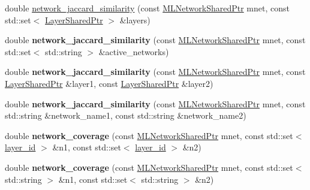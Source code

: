 \begin{DoxyCompactItemize}
\item 
double \hyperlink{namespacemlnet_ac67126e07743387172dfdc8bca49534d}{network\+\_\+jaccard\+\_\+similarity} (const \hyperlink{namespacemlnet_aa6d3fa87865bcde4d1283abb1942cbbb}{M\+L\+Network\+Shared\+Ptr} mnet, const std\+::set$<$ \hyperlink{namespacemlnet_a10c007fb811c55339dd5b9d32bb0505d}{Layer\+Shared\+Ptr} $>$ \&layers)
\item 
\hypertarget{namespacemlnet_ab1cc07d57abc29880ce1508d71ebf62e}{double {\bfseries network\+\_\+jaccard\+\_\+similarity} (const \hyperlink{namespacemlnet_aa6d3fa87865bcde4d1283abb1942cbbb}{M\+L\+Network\+Shared\+Ptr} mnet, const std\+::set$<$ std\+::string $>$ \&active\+\_\+networks)}\label{namespacemlnet_ab1cc07d57abc29880ce1508d71ebf62e}

\item 
\hypertarget{namespacemlnet_a01b6385edb10112a53804d04ec95cedf}{double {\bfseries network\+\_\+jaccard\+\_\+similarity} (const \hyperlink{namespacemlnet_aa6d3fa87865bcde4d1283abb1942cbbb}{M\+L\+Network\+Shared\+Ptr} mnet, const \hyperlink{namespacemlnet_a10c007fb811c55339dd5b9d32bb0505d}{Layer\+Shared\+Ptr} \&layer1, const \hyperlink{namespacemlnet_a10c007fb811c55339dd5b9d32bb0505d}{Layer\+Shared\+Ptr} \&layer2)}\label{namespacemlnet_a01b6385edb10112a53804d04ec95cedf}

\item 
\hypertarget{namespacemlnet_a88f5708c994054200f814a94e2ce1bef}{double {\bfseries network\+\_\+jaccard\+\_\+similarity} (const \hyperlink{namespacemlnet_aa6d3fa87865bcde4d1283abb1942cbbb}{M\+L\+Network\+Shared\+Ptr} mnet, const std\+::string \&network\+\_\+name1, const std\+::string \&network\+\_\+name2)}\label{namespacemlnet_a88f5708c994054200f814a94e2ce1bef}

\item 
\hypertarget{namespacemlnet_ac4c4b88ac2629fddbcbe764709c51c15}{double {\bfseries network\+\_\+coverage} (const \hyperlink{namespacemlnet_aa6d3fa87865bcde4d1283abb1942cbbb}{M\+L\+Network\+Shared\+Ptr} mnet, const std\+::set$<$ \hyperlink{namespacemlnet_a84ad9c6056f0eb7d129995351f9b13fb}{layer\+\_\+id} $>$ \&n1, const std\+::set$<$ \hyperlink{namespacemlnet_a84ad9c6056f0eb7d129995351f9b13fb}{layer\+\_\+id} $>$ \&n2)}\label{namespacemlnet_ac4c4b88ac2629fddbcbe764709c51c15}

\item 
\hypertarget{namespacemlnet_a522620b695244aa276e959a54bf2c246}{double {\bfseries network\+\_\+coverage} (const \hyperlink{namespacemlnet_aa6d3fa87865bcde4d1283abb1942cbbb}{M\+L\+Network\+Shared\+Ptr} mnet, const std\+::set$<$ std\+::string $>$ \&n1, const std\+::set$<$ std\+::string $>$ \&n2)}\label{namespacemlnet_a522620b695244aa276e959a54bf2c246}


\end{DoxyCompactItemize}
